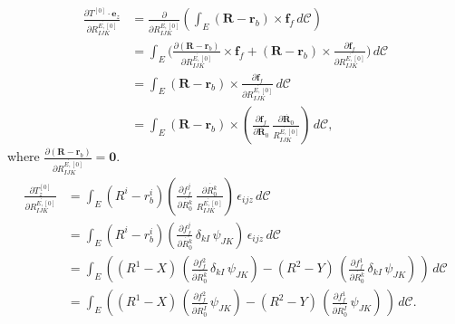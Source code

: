 \documentclass[a4paper,12pt]{article}
\begin{document}
\begin{equation}
	\label{eqn:144}
	\begin{aligned}
	\frac{\partial T^{[0]}\cdot\bm{e}_z}{\partial \dot{R_{IJK}^{E,[0]}}}&=\frac{\partial}{\partial \dot{R_{IJK}^{E,[0]}}}\left(\int_E (\bm{R}-\bm{r}_b)\times \bm{f}_f\,d\mathcal{C}\right)\\
	&=\int_E\Big(\frac{\partial (\bm{R}-\bm{r}_b)}{\partial \dot{R_{IJK}^{E,[0]}}}\times \bm{f}_f+(\bm{R}-\bm{r}_b)\times \frac{\partial \bm{f}_f}{\partial \dot{R_{IJK}^{E,[0]}}}\Big)\,d\mathcal{C}\\
	&=\int_E(\bm{R}-\bm{r}_b)\times \frac{\partial \bm{f}_f}{\partial \dot{R_{IJK}^{E,[0]}}}\,d\mathcal{C}\\
	&=\int_E(\bm{R}-\bm{r}_b)\times \left(\frac{\partial \bm{f}_f}{\partial \dot{\bm{R}_0}}\,\frac{\partial \dot{\bm{R}_0}}{\dot{R_{IJK}^{E,[0]}}} \right)\,d\mathcal{C},	
	\end{aligned}
\end{equation}
where $\frac{\partial (\bm{R}-\bm{r}_b)}{\partial \dot{R_{IJK}^{E,[0]}}}=\bm{0}$.
\begin{equation}
	\label{eqn:145}
	\begin{aligned}
		\frac{\partial T_z^{[0]}}{\partial \dot{R_{IJK}^{E,[0]}}}
		&=\int_E(R^i-r_b^i)\left(\frac{\partial f^j_f}{\partial \dot{R^k_0}}\,\frac{\partial \dot{R^k_0}}{\dot{R_{IJK}^{E,[0]}}} \right)\,\epsilon_{ijz}\,d\mathcal{C}\\
		&=\int_E(R^i-r_b^i)\left(\frac{\partial f^j_f}{\partial \dot{R^k_0}}\,\delta_{kI}\,\psi_{JK} \right)\,\epsilon_{ijz}\,d\mathcal{C}\\
		&=\int_E\left((R^1-X)\, \left(\frac{\partial f^2_f}{\partial \dot{R^k_0}}\,\delta_{kI}\,\psi_{JK} \right)-(R^2-Y)\, \left(\frac{\partial f^1_f}{\partial \dot{R^k_0}}\,\delta_{kI}\,\psi_{JK} \right)\,\right)\,d\mathcal{C}\\
		&=\int_E\left((R^1-X)\, \left(\frac{\partial f^2_f}{\partial \dot{R^I_0}}\,\psi_{JK} \right)-(R^2-Y)\, \left(\frac{\partial f^1_f}{\partial \dot{R^I_0}}\,\psi_{JK} \right)\,\right)\,d\mathcal{C}.
	\end{aligned}
\end{equation}
\end{document}
